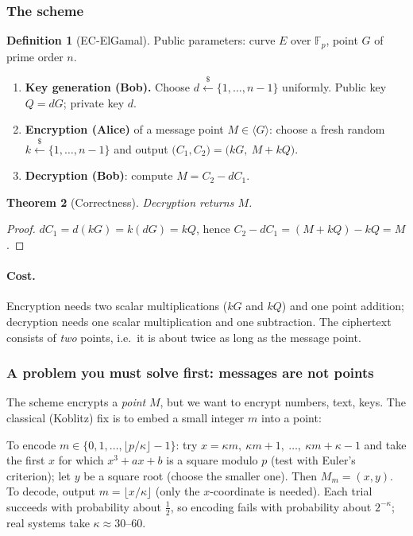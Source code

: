 \documentclass[11pt,a4paper,oneside]{book}
\theoremstyle{plain}
\newtheorem{theorem}{Theorem}[chapter]
\theoremstyle{definition}
\newtheorem{definition}[theorem]{Definition}
\theoremstyle{remark}
\newcommand{\F}{\mathbb{F}}
\newcommand{\sample}{\xleftarrow{\$}}
\begin{document}
\subsubsection*{The scheme}

\begin{definition}[EC-ElGamal]\label{def:ECEG}
Public parameters: curve $E$ over $\F_p$, point $G$ of prime order $n$.
\begin{enumerate}[nosep,label=\textbf{\arabic*.}]
\item \textbf{Key generation (Bob).} Choose $d\sample\{1,\dots,n-1\}$ uniformly. Public key $Q=dG$; private key $d$.
\item \textbf{Encryption (Alice)} of a message point $M\in\langle G\rangle$: choose a fresh random $k\sample\{1,\dots,n-1\}$ and output $\big(C_1,C_2\big)=\big(kG,\ M+kQ\big)$.
\item \textbf{Decryption (Bob)}: compute $M=C_2-dC_1$.
\end{enumerate}
\end{definition}

\begin{theorem}[Correctness]
Decryption returns $M$.
\end{theorem}
\begin{proof}
$dC_1=d(kG)=k(dG)=kQ$, hence $C_2-dC_1=(M+kQ)-kQ=M$.
\end{proof}

\paragraph{Cost.} Encryption needs two scalar multiplications ($kG$ and $kQ$) and one point addition; decryption needs one scalar multiplication and one subtraction. The ciphertext consists of \emph{two} points, i.e.\ it is about twice as long as the message point.

\subsubsection*{A problem you must solve first: messages are not points}

The scheme encrypts a \emph{point} $M$, but we want to encrypt numbers, text, keys. The classical (Koblitz) fix is to embed a small integer $m$ into a point:

\begin{keyidea}
To encode $m\in\{0,1,\dots,\lfloor p/\kappa\rfloor-1\}$: try $x=\kappa m,\ \kappa m+1,\ \dots,\ \kappa m+\kappa-1$ and take the first $x$ for which $x^3+ax+b$ is a square modulo $p$ (test with Euler's criterion); let $y$ be a square root (choose the smaller one). Then $M_m=(x,y)$. To decode, output $m=\lfloor x/\kappa\rfloor$ (only the $x$-coordinate is needed). Each trial succeeds with probability about $\frac12$, so encoding fails with probability about $2^{-\kappa}$; real systems take $\kappa\approx30$--$60$.
\end{keyidea}
\end{document}
